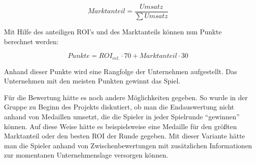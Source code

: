 \begin{equation}
     Marktanteil = \frac{Umsatz}{\sum Umsatz}
     \label{alg:spielwelt-logik-bewertung-Marktanteil}
\end{equation}

Mit Hilfe des anteiligen ROI's und des Marktanteils können nun Punkte berechnet werden:

\begin{equation}
     Punkte = ROI_{rel.} \cdot 70 + Marktanteil \cdot 30
     \label{alg:spielwelt-logik-bewertung-Punkte}
\end{equation}

Anhand dieser Punkte wird eine Rangfolge der Unternehmen aufgestellt. Das Unternehmen mit den meisten Punkten gewinnt das
Spiel.

\bigskip

Für die Bewertung hätte es noch andere Möglichkeiten gegeben. So wurde in der Gruppe zu Beginn des Projekts diskutiert,
ob man die Endauswertung nicht anhand von Medaillen umsetzt, die die Spieler in jeder Spielrunde “gewinnen” können. Auf
diese Weise hätte es beispielsweise eine Medaille für den größten Marktanteil oder den besten ROI der Runde gegeben. Mit
dieser Variante hätte man die Spieler anhand von Zwischenbewertungen mit zusätzlichen Informationen zur momentanen
Unternehmenslage versorgen können.